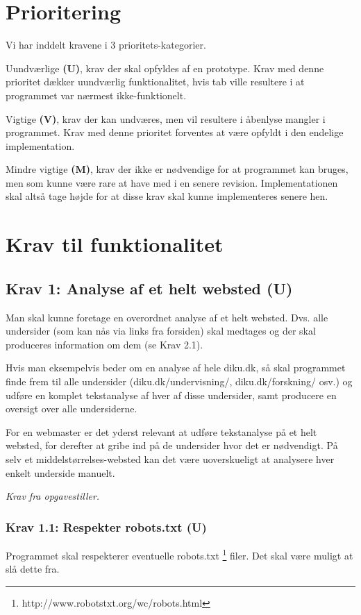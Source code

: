 \documentclass[a4paper,oneside,article]{memoir}
\begin{document}
\section{Prioritering}
Vi har inddelt kravene i 3 prioritets-kategorier.
\begin{description}
\item Uundværlige \textbf{(U)}, krav der skal opfyldes af en
  prototype. Krav med denne prioritet dækker uundværlig
  funktionalitet, hvis tab ville resultere i at programmet var nærmest
  ikke-funktionelt.
\item Vigtige \textbf{(V)}, krav der kan undværes, men vil resultere i
  åbenlyse mangler i programmet. Krav med denne prioritet forventes at
  være opfyldt i den endelige implementation.
\item Mindre vigtige \textbf{(M)}, krav der ikke er nødvendige for at
  programmet kan bruges, men som kunne være rare at have med i en
  senere revision. Implementationen skal altså tage højde for at disse
  krav skal kunne implementeres senere hen.
\end{description}

\section{Krav til funktionalitet}
\subsection{Krav 1: Analyse af et helt websted (U)}
Man skal kunne foretage en overordnet analyse af et helt
websted. Dvs. alle undersider (som kan nås via links fra forsiden)
skal medtages og der skal produceres information om dem (se Krav 2.1).

Hvis man eksempelvis beder om en analyse af hele diku.dk, så skal
programmet finde frem til alle undersider (diku.dk/undervisning/,
diku.dk/forskning/ osv.) og udføre en komplet tekstanalyse af hver af
disse undersider, samt producere en oversigt over alle undersiderne.

For en webmaster er det yderst relevant at udføre tekstanalyse på et
helt websted, for derefter at gribe ind på de undersider hvor det er
nødvendigt. På selv et middelstørrelses-websted kan det være
uoverskueligt at analysere hver enkelt underside manuelt.

\textit{Krav fra opgavestiller.}

\subsubsection {Krav 1.1: Respekter robots.txt (U)}
Programmet skal respekterer eventuelle robots.txt
\footnote{http://www.robotstxt.org/wc/robots.html} filer. Det skal
være muligt at slå dette fra.
\end{document}
